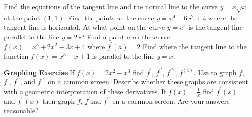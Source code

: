 \begin{Exercise}[title={Maximums, Minimums, and Tangents},label=exMinMax]
\Question Find the equations of the	tangent line and the normal line to the curve $y =x \sqrt{x}$ at the point $(1 ,1)$. %
\Question Find the points on the curve $y =x^{4} -6 x^{2} +4$ where the tangent line is horizontal. %
\Question At what point on the curve $y =e^{x}$ is the tangent line parallel to the line $y =2 x$? %
\Question Find a point $a$ on the curve $f (x) =x^{3} +2 x^{2} +3 x +4$ where $f^{ \prime } (a) =2$ %
\Question Find where the tangent line to the function $f (x) =x^{3} -x +1$ is parallel to the line $y =x$.  %

{\hspace{-0.6cm}\textbf{Graphing Exercise}}
\Question If $f (x) =2 x^{2} -x^{3}$ find $f^{ \prime }$, $f^{ \prime  \prime }$, $f^{ \prime  \prime  \prime }$, $f^{(4)}$. Use \Desmos to graph $f$, $f^{ \prime }$, $f^{ \prime  \prime }$, and $f^{ \prime  \prime  \prime }$ on a common screen. Describe whether these graphs are consistent with a geometric interpretation of these derivatives. %
\Question If $f (x) =\frac{1}{x}$ find $f^{ \prime } (x)$ and $f^{ \prime  \prime } (x)$ then graph $f$, $f^{ \prime }$and $f^{ \prime  \prime }$ on a common screen. Are your answers reasonable? %

\end{Exercise}
